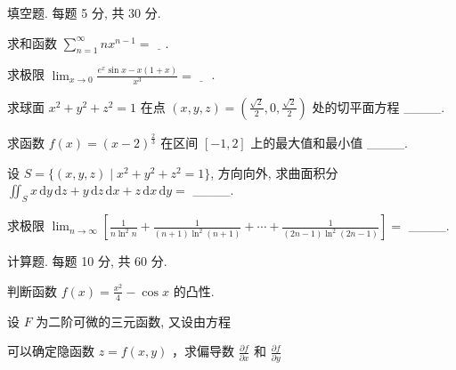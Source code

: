 \par{}
填空题. 每题 5 分, 共 30 分.\par
求和函数 $\sum_{n=1}^{\infty} nx^{n-1} = \underline{\quad}$.\par
求极限  $\lim_{x\to0}\frac{e^{x}\sin x-x(1+x)}{x^{3}}=\underline{\quad}$ .\par
求球面  $x^{2} + y^{2} + z^{2} = 1$  在点  $(x, y, z) = \left(\frac{\sqrt{2}}{2}, 0, \frac{\sqrt{2}}{2}\right)$  处的切平面方程 \_\_\_\_.\par
求函数  $f(x)=(x-2)^{\frac{2}{3}}$  在区间  $[-1,2]$  上的最大值和最小值 \_\_\_\_.\par
设 $S = \{(x, y, z) \mid x^2 + y^2 + z^2 = 1\}$, 方向向外, 求曲面积分 $\iint_{S} x \, \mathrm{d}y \, \mathrm{d}z + y \, \mathrm{d}z \, \mathrm{d}x + z \, \mathrm{d}x \, \mathrm{d}y =$ \_\_\_\_.\par
求极限  $\lim_{n\to\infty}\left[\frac{1}{n\ln^{2}n}+\frac{1}{(n+1)\ln^{2}(n+1)}+\cdots+\frac{1}{(2n-1)\ln^{2}(2n-1)}\right]=$  \_\_\_\_.\par
\par{}
计算题. 每题 10 分, 共 60 分.\par
判断函数 $f(x) = \frac{x^2}{4} - \cos x$ 的凸性.\par
\par{}
设 $F$ 为二阶可微的三元函数, 又设由方程\par
\nopagebreak[4]
可以确定隐函数 $z = f(x,y)$ ，求偏导数 $\frac{\partial f}{\partial x}$ 和 $\frac{\partial f}{\partial y}$\par
